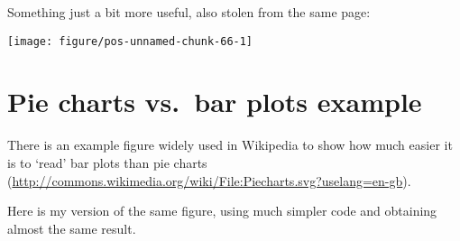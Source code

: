 \documentclass[paper=a4,10pt,div=17,headsepline,BCOR=12mm,twoside,open=right]{scrbook}\usepackage{knitr}
\begin{document}
Something just a bit more useful, also stolen from the same page:

\begin{knitrout}\footnotesize
{}\color{fgcolor}\begin{kframe}
\begin{alltt}
 \hlkwb{<-}  \hlstd{(} \hlstd{=} \hlstd{(}\hlstd{),}  \hlstd{=}  \hlopt{+}
 \hlstd{(} \hlstd{=} \hlstd{)}
 \hlopt{+} \hlstd{(} \hlstd{=} \hlstd{)}
\end{alltt}
\end{kframe}

{\centering \texttt{[image: figure/pos-unnamed-chunk-66-1]} 

}



\end{knitrout}

\section{Pie charts vs.\ bar plots example}

There is an example figure widely used in Wikipedia to show how much easier it is to `read' bar plots than pie charts (\url{http://commons.wikimedia.org/wiki/File:Piecharts.svg?uselang=en-gb}). %



Here is my \ggplot version of the same figure, using much simpler code and obtaining almost the same result.
\end{document}
